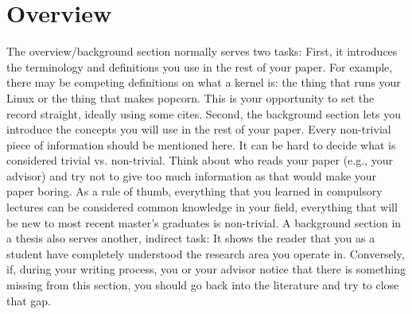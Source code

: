 \chapter{Overview}\label{ch:overview}
The overview/background section normally serves two tasks: First, it introduces the terminology and definitions you use in the rest of your paper.
For example, there may be competing definitions on what a kernel is: the thing that runs your Linux or the thing that makes popcorn.
This is your opportunity to set the record straight, ideally using some cites.
Second, the background section lets you introduce the concepts you will use in the rest of your paper.
Every non-trivial piece of information should be mentioned here. It can be hard to decide what is considered trivial vs. non-trivial.
Think about who reads your paper (e.g., your advisor) and try not to give too much information as that would make your paper boring.
As a rule of thumb, everything that you learned in compulsory lectures can be considered common knowledge in your field, everything that will be new to most recent master’s graduates is non-trivial.
A background section in a thesis also serves another, indirect task: It shows the reader that you as a student have completely understood the research area you operate in.
Conversely, if, during your writing process, you or your advisor notice that there is something missing from this section, you should go back into the literature and try to close that gap.
